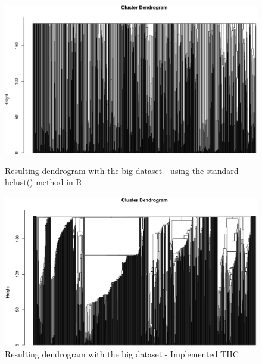 \documentclass[a4paper,10pt]{article}
\theoremstyle{plain}
\theoremstyle{definition}
\begin{document}
\begin{figure}[H]
	\centering
	\begin{minipage}{0.75\textwidth}
		\includegraphics[width=1\textwidth]{./pictures/dendrogramHclustBigData.png}
		\caption{Resulting dendrogram with the big dataset - using the standard hclust() method in R}
		\label{fig:dendrogramHclustStandardBigData}
	\end{minipage}
	\begin{minipage}{0.75\textwidth}
		\includegraphics[width=1\textwidth]{./pictures/dendrogramBigDataHcImplemented.png}
		\caption{Resulting dendrogram with the big dataset - Implemented THC}
		\label{fig:dendrogramHcImplementedBigData}
	\end{minipage}
\end{figure}

\end{document}
